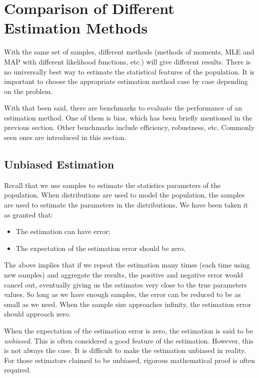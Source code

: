 \section{Comparison of Different Estimation Methods}

With the same set of samples, different methods (methods of moments, MLE and MAP with different likelihood functions, etc.) will give different results. There is no universally best way to estimate the statistical features of the population. It is important to choose the appropriate estimation method case by case depending on the problem.

With that been said, there are benchmarks to evaluate the performance of an estimation method. One of them is bias, which has been briefly mentioned in the previous section. Other benchmarks include efficiency, robustness, etc. Commonly seen ones are introduced in this section.

\subsection{Unbiased Estimation}

Recall that we use samples to estimate the statistics parameters of the population. When distributions are used to model the population, the samples are used to estimate the parameters in the distributions. We have been taken it as granted that:
\begin{itemize}
	\item The estimation can have error;
	\item The expectation of the estimation error should be zero.
\end{itemize}
The above implies that if we repeat the estimation many times (each time using new samples) and aggregate the results, the positive and negative error would cancel out, eventually giving us the estimates very close to the true parameters values. So long as we have enough samples, the error can be reduced to be as small as we need. When the sample size approaches infinity, the estimation error should approach zero.

When the expectation of the estimation error is zero, the estimation is said to be \textit{unbiased}. This is often considered a good feature of the estimation. However, this is not always the case. It is difficult to make the estimation unbiased in reality. For those estimators claimed to be unbiased, rigorous mathematical proof is often required.

